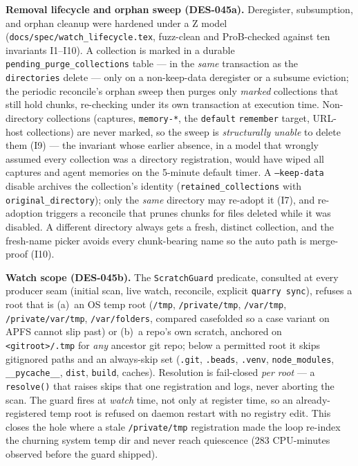 \documentclass[a4paper,10pt]{article}
\begin{document}
\textbf{Removal lifecycle and orphan sweep (DES-045a).}  Deregister,
subsumption, and orphan cleanup were hardened under a Z model
(\texttt{docs/spec/watch\_lifecycle.tex}, fuzz-clean and ProB-checked against
ten invariants I1--I10).  A collection is marked in a durable
\texttt{pending\_purge\_collections} table --- in the \emph{same} transaction as
the \texttt{directories} delete --- only on a non-keep-data deregister or a
subsume eviction; the periodic reconcile's orphan sweep then purges only
\emph{marked} collections that still hold chunks, re-checking under its own
transaction at execution time.  Non-directory collections (captures,
\texttt{memory-*}, the \texttt{default} \texttt{remember} target, URL-host
collections) are never marked, so the sweep is \emph{structurally unable} to
delete them (I9) --- the invariant whose earlier absence, in a model that
wrongly assumed every collection was a directory registration, would have wiped
all captures and agent memories on the 5-minute default timer.  A
\texttt{--keep-data} disable archives the collection's identity
(\texttt{retained\_collections} with \texttt{original\_directory}); only the
\emph{same} directory may re-adopt it (I7), and re-adoption triggers a reconcile
that prunes chunks for files deleted while it was disabled.  A different
directory always gets a fresh, distinct collection, and the fresh-name picker
avoids every chunk-bearing name so the auto path is merge-proof (I10).

\textbf{Watch scope (DES-045b).}  The \texttt{ScratchGuard} predicate, consulted
at every producer seam (initial scan, live watch, reconcile, explicit
\texttt{quarry sync}), refuses a root that is (a)~an OS temp root
(\texttt{/tmp}, \texttt{/private/tmp}, \texttt{/var/tmp},
\texttt{/private/var/tmp}, \texttt{/var/folders}, compared casefolded so a case
variant on APFS cannot slip past) or (b)~a repo's own scratch, anchored on
\texttt{<gitroot>/.tmp} for \emph{any} ancestor git repo; below a permitted
root it skips gitignored paths and an always-skip set (\texttt{.git},
\texttt{.beads}, \texttt{.venv}, \texttt{node\_modules}, \texttt{\_\_pycache\_\_},
\texttt{dist}, \texttt{build}, caches).  Resolution is fail-closed \emph{per
root} --- a \texttt{resolve()} that raises skips that one registration and logs,
never aborting the scan.  The guard fires at \emph{watch} time, not only at
register time, so an already-registered temp root is refused on daemon restart
with no registry edit.  This closes the hole where a stale \texttt{/private/tmp}
registration made the loop re-index the churning system temp dir and never reach
quiescence (283 CPU-minutes observed before the guard shipped).
\end{document}
